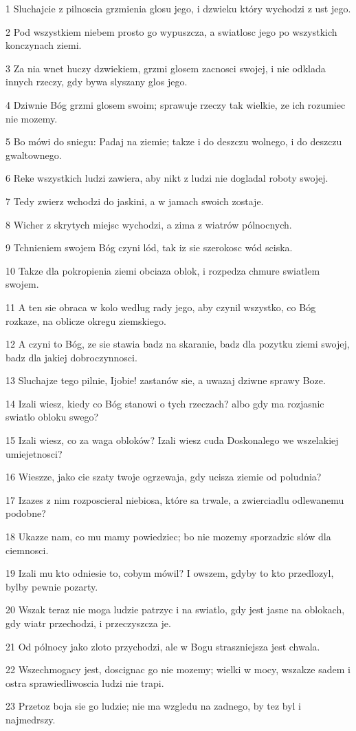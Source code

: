 \par 1 Sluchajcie z pilnoscia grzmienia glosu jego, i dzwieku który wychodzi z ust jego.
\par 2 Pod wszystkiem niebem prosto go wypuszcza, a swiatlosc jego po wszystkich konczynach ziemi.
\par 3 Za nia wnet huczy dzwiekiem, grzmi glosem zacnosci swojej, i nie odklada innych rzeczy, gdy bywa slyszany glos jego.
\par 4 Dziwnie Bóg grzmi glosem swoim; sprawuje rzeczy tak wielkie, ze ich rozumiec nie mozemy.
\par 5 Bo mówi do sniegu: Padaj na ziemie; takze i do deszczu wolnego, i do deszczu gwaltownego.
\par 6 Reke wszystkich ludzi zawiera, aby nikt z ludzi nie dogladal roboty swojej.
\par 7 Tedy zwierz wchodzi do jaskini, a w jamach swoich zostaje.
\par 8 Wicher z skrytych miejsc wychodzi, a zima z wiatrów pólnocnych.
\par 9 Tchnieniem swojem Bóg czyni lód, tak iz sie szerokosc wód sciska.
\par 10 Takze dla pokropienia ziemi obciaza oblok, i rozpedza chmure swiatlem swojem.
\par 11 A ten sie obraca w kolo wedlug rady jego, aby czynil wszystko, co Bóg rozkaze, na oblicze okregu ziemskiego.
\par 12 A czyni to Bóg, ze sie stawia badz na skaranie, badz dla pozytku ziemi swojej, badz dla jakiej dobroczynnosci.
\par 13 Sluchajze tego pilnie, Ijobie! zastanów sie, a uwazaj dziwne sprawy Boze.
\par 14 Izali wiesz, kiedy co Bóg stanowi o tych rzeczach? albo gdy ma rozjasnic swiatlo obloku swego?
\par 15 Izali wiesz, co za waga obloków? Izali wiesz cuda Doskonalego we wszelakiej umiejetnosci?
\par 16 Wieszze, jako cie szaty twoje ogrzewaja, gdy ucisza ziemie od poludnia?
\par 17 Izazes z nim rozposcieral niebiosa, które sa trwale, a zwierciadlu odlewanemu podobne?
\par 18 Ukazze nam, co mu mamy powiedziec; bo nie mozemy sporzadzic slów dla ciemnosci.
\par 19 Izali mu kto odniesie to, cobym mówil? I owszem, gdyby to kto przedlozyl, bylby pewnie pozarty.
\par 20 Wszak teraz nie moga ludzie patrzyc i na swiatlo, gdy jest jasne na oblokach, gdy wiatr przechodzi, i przeczyszcza je.
\par 21 Od pólnocy jako zloto przychodzi, ale w Bogu straszniejsza jest chwala.
\par 22 Wszechmogacy jest, doscignac go nie mozemy; wielki w mocy, wszakze sadem i ostra sprawiedliwoscia ludzi nie trapi.
\par 23 Przetoz boja sie go ludzie; nie ma wzgledu na zadnego, by tez byl i najmedrszy.

